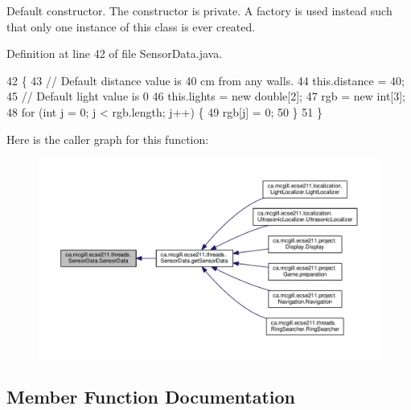 Default constructor. The constructor is private. A factory is used instead such that only one instance of this class is ever created. 

Definition at line 42 of file Sensor\+Data.\+java.


\begin{DoxyCode}
42                          \{
43     \textcolor{comment}{// Default distance value is 40 cm from any walls.}
44     this.distance = 40;
45     \textcolor{comment}{// Default light value is 0}
46     this.lights = \textcolor{keyword}{new} \textcolor{keywordtype}{double}[2];
47     rgb = \textcolor{keyword}{new} \textcolor{keywordtype}{int}[3];
48     \textcolor{keywordflow}{for} (\textcolor{keywordtype}{int} j = 0; j < rgb.length; j++) \{
49       rgb[j] = 0;
50     \}
51   \}
\end{DoxyCode}
Here is the caller graph for this function\+:\nopagebreak
\begin{figure}[H]
\begin{center}
\leavevmode
\includegraphics[width=350pt]{classca_1_1mcgill_1_1ecse211_1_1threads_1_1_sensor_data_a11dcdc9c15184e05a9c84fc3958e26b6_icgraph}
\end{center}
\end{figure}


\subsection{Member Function Documentation}
\mbox{\label{classca_1_1mcgill_1_1ecse211_1_1threads_1_1_sensor_data_acc8f6cc56f39c8ea6b812cd8b135eca6}} 
